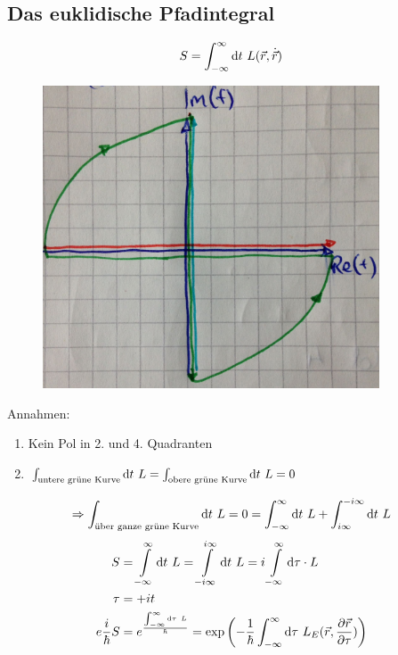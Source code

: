 \subsection{Das euklidische Pfadintegral} 
	\begin{align*}
		S= \int_{-\infty}^{\infty} \mathrm{d} t ~L(\vec{r}, \dot{\vec{r}})
	\end{align*}
			\begin{figure} [h]
			\begin{center}
				\includegraphics[width=10cm]{euklidisches_Pfradintegral1}
			\end{center}
			\end{figure} 
\FloatBarrier
Annahmen:
	\begin{enumerate}[(1)]
		\item Kein Pol in 2. und 4. Quadranten
		\item $\int_{\text{untere grüne Kurve}} \mathrm{d} t~L = \int_{\text{obere grüne Kurve}} \mathrm{d} t ~L = 0$
	\end{enumerate}
	\begin{align*}
	\Rightarrow \int_{\text{über ganze grüne Kurve}} \mathrm{d} t ~L = 0 = \int_{-\infty}^{\infty} \mathrm{d} t ~L + \int_{i\infty}^{-i\infty} \mathrm{d} t ~L
	\end{align*}	
	\begin{align*}
		S &= \int \limits_{-\infty}^{\infty} \mathrm{d} t ~L = \int \limits_{-i\infty}^{i\infty} \mathrm{d} t ~L = i \int \limits_{-\infty}^{\infty} \mathrm{d} \tau \cdot L \\
		\tau &= + it \\
		e{\frac{i}{\hbar} S} &= e^{\frac{\int_{-\infty}^{\infty}\mathrm{d} \tau ~L}{\hbar}} =
		\exp\left(-\frac{1}{\hbar} \int_{-\infty}^{\infty} \mathrm{d} \tau ~L_E(\vec{r}, \frac{\partial \vec{r}}{\partial \tau})\right)
	\end{align*}
